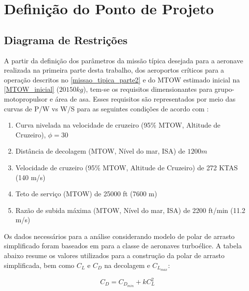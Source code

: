 \chapter{Definição do Ponto de Projeto}
\label{diagramarestricoes}

\section{Diagrama de Restrições}

A partir da definição dos parâmetros da missão típica desejada para a aeronave realizada na primeira parte desta trabalho, dos aeroportos críticos para a operação descritos no \autoref{missao_tipica_parte2} e do MTOW estimado inicial na \autoref{MTOW_inicial} ($20150 kg$), tem-se os requisitos dimensionantes para grupo-motopropulsor e área de asa.
Esses requisitos são representados por meio das curvas de P/W vs W/S para as seguintes condições de acordo com \cite{gudmundsson}:
 
\begin{enumerate}

\item Curva nivelada na velocidade de cruzeiro (95\% MTOW, Altitude de Cruzeiro), $\phi = 30$\textdegree\

\item Distância de decolagem (MTOW, Nível do mar, ISA) de $1200 m$

\item Velocidade de cruzeiro (95\% MTOW, Altitude de Cruzeiro) de 272 KTAS (140 m/s)

\item Teto de serviço (MTOW) de 25000 ft (7600 m)

\item Razão de subida máxima (MTOW, Nível do mar, ISA) de 2200 ft/min (11.2 m/s)

\end{enumerate}


Os dados necessários para a análise considerando modelo de polar de arrasto simplificado foram baseados em \cite{gudmundsson} para a classe de aeronaves turboélice.
A tabela abaixo resume os valores utilizados para a construção da polar de arrasto simplificada, bem como $C_L$ e $C_D$ na decolagem e $C_{L_{max}}$:

\begin{equation}
C_D = C_{D_{min}} + k C_L^2
\end{equation}

